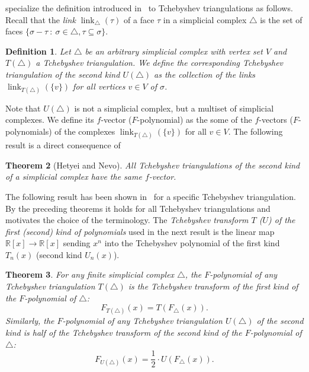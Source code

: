 \documentclass[reqno,12pt]{amsart}
\numberwithin{equation}{section}
\newtheorem{theorem}{Theorem}[section]
\newtheorem{definition}[theorem]{Definition}
\DeclareMathOperator{\link}{link}
\newcommand{\0}{\widehat{0}}
\newcommand{\1}{\widehat{1}}
\newcommand{\2}{\widehat{2}}
\begin{document}
specialize the definition introduced in~\cite{Hetyei-Nevo} to Tchebyshev
triangulations as follows. Recall that the {\em link
  $\link_{\triangle}(\tau)$} of a 
face $\tau$ in a simplicial complex $\triangle$ is the set of faces
$\{\sigma-\tau\: : \: \sigma\in \triangle, \tau\subseteq \sigma\}$. 
\begin{definition}
Let $\triangle$ be an arbitrary simplicial complex with vertex set $V$
and $T(\triangle)$ a Tchebyshev triangulation. We define the {\em
  corresponding Tchebyshev triangulation of the second kind
  $U(\triangle)$} as the collection of the links
$\link_{T(\triangle)}(\{v\})$ for all vertices $v\in V$ of $\sigma$.
\end{definition}  
Note that $U(\triangle)$ is not a simplicial complex, but a multiset of
simplicial complexes. We define its $f$-vector ($F$-polynomial) as the
some of the $f$-vectors ($F$-polynomials) of the complexes
$\link_{T(\triangle)}(\{v\})$ for all $v\in V$. The following result is
a direct consequence of~\cite[Theorem 3.3]{Hetyei-Nevo} 
\begin{theorem}[Hetyei and Nevo]
\label{thm:Hetyei-Nevo2}  
All Tchebyshev triangulations of the second kind of a simplicial complex
have the same $f$-vector. 
\end{theorem}
The following result has been shown in~\cite[Propositions 3.3 and
  4.4]{Hetyei-tt} for a specific Tchebyshev triangulation. By the
preceding theorems it holds for all Tchebyshev triangulations and
motivates the choice of the terminology. The {\em Tchebyshev transform
  $T$ ($U$) of the first (second) kind of polynomials} used in the
next result is  the linear map ${\mathbb 
  R}[x]\longrightarrow {\mathbb R}[x]$ sending $x^n$ into the Tchebyshev
polynomial of the first kind $T_n(x)$ (second kind $U_n(x)$).
\begin{theorem}
  \label{thm:tt}
For any finite simplicial complex $\triangle$, the $F$-polynomial of any
Tchebyshev triangulation $T(\triangle)$ is the Tchebyshev transform of
the first kind of the $F$-polynomial of $\triangle$:
$$
F_{T(\triangle)}(x)=T(F_{\triangle}(x)).
$$
Similarly, the $F$-polynomial of any Tchebyshev triangulation
$U(\triangle)$ of the second kind is half of the Tchebyshev transform of
the second kind of the $F$-polynomial of $\triangle$:
$$
F_{U(\triangle)}(x)=\frac{1}{2}\cdot U(F_{\triangle}(x)).
$$
\end{theorem}
\end{document}
